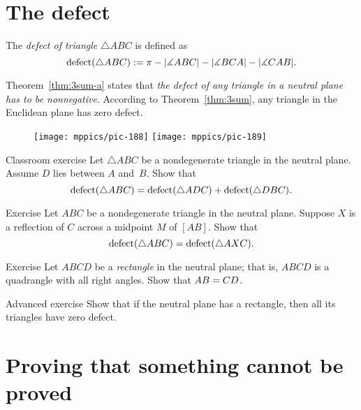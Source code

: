 \section{The defect}\label{The defect}

The \emph{defect of triangle} $\triangle ABC$ is defined as 
$$\mathop{\rm defect}\nolimits(\triangle ABC)
:= 
\pi-|\measuredangle ABC|-|\measuredangle BCA|-|\measuredangle CAB|.$$

Theorem~\ref{thm:3sum-a} states that \textit{the defect of any triangle in a neutral plane has to be nonnegative}.
According to Theorem~\ref{thm:3sum}, any triangle in
the Euclidean plane has zero defect.

{

\begin{wrapfigure}{o}{24mm}
\vskip-6mm
\centering
\texttt{[image: mppics/pic-188]}
\vskip4mm
\texttt{[image: mppics/pic-189]}
\end{wrapfigure}

\begin{thm}{Classroom exercise}\label{ex:defect}
Let $\triangle ABC$ be a nondegenerate triangle in the neutral plane.
Assume $D$ lies between $A$ and~$B$.
Show that 
$$\mathop{\rm defect}\nolimits(\triangle ABC)=\mathop{\rm defect}\nolimits(\triangle ADC)+\mathop{\rm defect}\nolimits(\triangle DBC).$$

\end{thm}


\begin{thm}{Exercise}\label{ex:defect=} Let $ABC$ be a nondegenerate triangle in the neutral plane.
Suppose $X$ is a reflection of $C$ across a midpoint $M$ of $[AB]$.
Show that 
$$\mathop{\rm defect}\nolimits(\triangle ABC)=\mathop{\rm defect}\nolimits(\triangle AXC).$$
\end{thm}

}

\vskip-2mm

\begin{thm}{Exercise}\label{ex:neutral-rectangle}
Let $ABCD$ be a \emph{rectangle} in the neutral plane;
that is, $ABCD$ is a quadrangle with all right angles.
Show that $AB=CD$. 
\end{thm}

\begin{thm}{Advanced exercise}\label{ex:neutral-rectangle+}
Show that if the neutral plane has a rectangle, then all its triangles have zero defect.
\end{thm}

\section{Proving that something cannot be proved}
\label{sec:unprovable}

